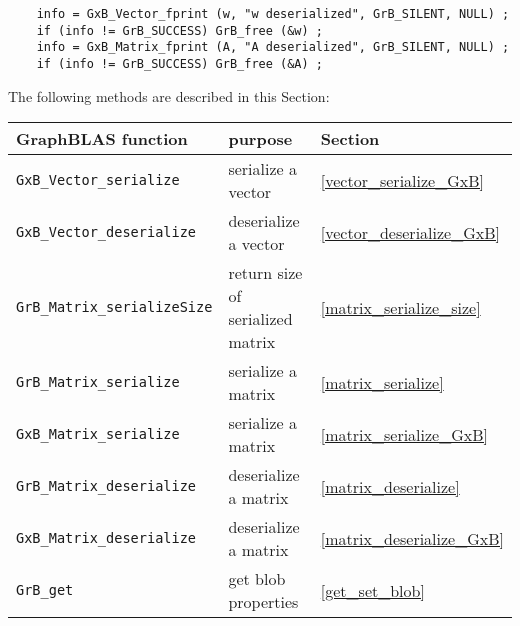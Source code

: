 \documentclass[12pt]{article}
\begin{document}
{\footnotesize
\begin{verbatim}
    info = GxB_Vector_fprint (w, "w deserialized", GrB_SILENT, NULL) ;
    if (info != GrB_SUCCESS) GrB_free (&w) ;
    info = GxB_Matrix_fprint (A, "A deserialized", GrB_SILENT, NULL) ;
    if (info != GrB_SUCCESS) GrB_free (&A) ; \end{verbatim}}

The following methods are described in this Section:

\vspace{0.2in}
\noindent
{\footnotesize
\begin{tabular}{lll}
\hline
GraphBLAS function   & purpose                                      & Section \\
\hline
\verb'GxB_Vector_serialize'      & serialize a vector               & \ref{vector_serialize_GxB} \\
\verb'GxB_Vector_deserialize'    & deserialize a vector             & \ref{vector_deserialize_GxB} \\
\hline
\verb'GrB_Matrix_serializeSize' & return size of serialized matrix & \ref{matrix_serialize_size} \\
\verb'GrB_Matrix_serialize'     & serialize a matrix               & \ref{matrix_serialize} \\
\verb'GxB_Matrix_serialize'     & serialize a matrix               & \ref{matrix_serialize_GxB} \\
\verb'GrB_Matrix_deserialize'   & deserialize a matrix             & \ref{matrix_deserialize} \\
\verb'GxB_Matrix_deserialize'   & deserialize a matrix             & \ref{matrix_deserialize_GxB} \\
\hline
\verb'GrB_get' & get blob properties & \ref{get_set_blob} \\
\hline
\end{tabular}
}

\end{document}
